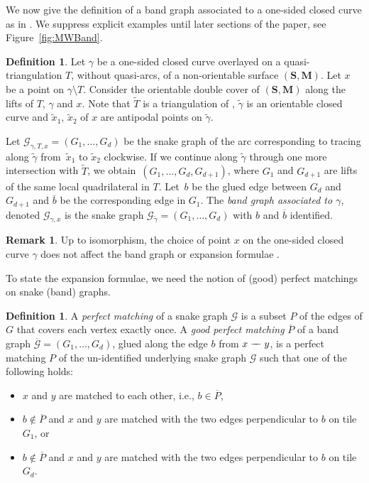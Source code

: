 \documentclass[pdftex]{sigma}
\numberwithin{equation}{section}
\theoremstyle{definition}
\newtheorem{Definition}[Theorem]{Definition}
\newtheorem{Remark}[Theorem]{Remark}
\newcommand{\SM}{(\mathbf{S}, \mathbf{M})}
\newcommand{\mathdash}{\relbar\mkern-9mu\relbar}
\begin{document}
We now give the definition of a band graph associated to a one-sided closed curve as in \cite{Wil19}. We suppress explicit examples until later sections of the paper, see Figure~\ref{fig:MWBand}.

\begin{Definition}\label{definition:bandgraphquasiarc}
 Let $\gamma$ be a one-sided closed curve overlayed on a quasi-triangulation $T$, without quasi-arcs, of a non-orientable surface $\SM$. Let $x$ be a point on $\gamma \setminus T$. Consider the orientable double cover \smash{$\widetilde{\SM}$} of $\SM$ along the lifts of $T$, $\gamma$ and $x$. Note that $\tilde{T}$ is a triangulation of \smash{$\widetilde{\SM}$}, $\tilde{\gamma}$ is an orientable closed curve and $\tilde{x}_1$, $\tilde{x}_2$ of $x$ are antipodal points on $\tilde{\gamma}$.

 Let $\mathcal{G}_{\gamma, T, x} = (G_1, \dots, G_d)$ be the snake graph of the arc corresponding to tracing along $\tilde{\gamma}$ from~$\tilde{x}_1$ to $\tilde{x}_2$ clockwise. If we continue along $\tilde{\gamma}$ through one more intersection with $\tilde{T}$, we obtain~${(G_1, \dots, G_d, G_{d+1})}$, where $G_1$ and $G_{d+1}$ are lifts of the same local quadrilateral in $T$. Let~$b$ be the glued edge between $G_d$ and $G_{d+1}$ and $\overline{b}$ be the corresponding edge in $G_1$. The \emph{band graph associated to $\gamma$}, denoted $\mathcal{G}_{\gamma, x}$ is the snake graph $\mathcal{G}_{\tilde{\gamma}} = (G_1, \dots, G_d)$ with $b$ and $\overline{b}$ identified.
\end{Definition}

\begin{Remark}
 Up to isomorphism, the choice of point $x$ on the one-sided closed curve $\gamma$ does not affect the band graph or expansion formulae \cite{Wil19}.
\end{Remark}

To state the expansion formulae, we need the notion of (good) perfect matchings on snake (band) graphs.

\begin{Definition}\label{definition:goodperfectmatching}
 A \emph{perfect matching} of a snake graph $\mathcal{G}$ is a subset $P$ of the edges of $G$ that covers each vertex exactly once. A \emph{good perfect matching} $\overline{P}$ of a band graph $\overline{\mathcal{G}} = (G_1, \dots, G_d)$, glued along the edge $b$ from $x \mathdash y$, is a perfect matching $P$ of the un-identified underlying snake graph $\mathcal{G}$ such that one of the following holds:
 \begin{itemize}\itemsep=0pt
 \item $x$ and $y$ are matched to each other, i.e., $b \in \overline{P}$,
 \item $b \notin \overline{P}$ and $x$ and $y$ are matched with the two edges perpendicular to $b$ on tile $G_1$, or
 \item $b \notin \overline{P}$ and $x$ and $y$ are matched with the two edges perpendicular to $b$ on tile $G_d$.
 \end{itemize}
\end{Definition}
\end{document}
